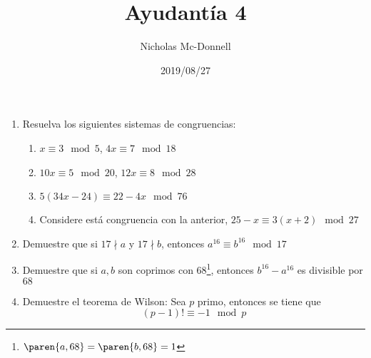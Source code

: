 \documentclass{ayudantia}
\title{Ayudantía 4}
\date{2019/08/27}
\author{Nicholas Mc-Donnell}
\begin{document}
\maketitle
\begin{enumerate}
    \item Resuelva los siguientes sistemas de congruencias:
    \begin{enumerate}[label=\alph*)]
        \item \(x\equiv 3\mod 5\), \(4x\equiv 7\mod 18\)
        \item \(10x\equiv 5\mod 20\), \(12x\equiv 8\mod 28\)
        \item \(5(34x-24)\equiv22-4x\mod 76\)
        \item Considere está congruencia con la anterior, \(25-x\equiv 3(x+2)\mod 27\)
    \end{enumerate}
    \item Demuestre que si \(17\nmid a\) y \(17\nmid b\), entonces \(a^{16}\equiv b^{16}\mod 17\)
    \item Demuestre que si \(a,b\) son coprimos con \(68\)\footnote{\(\paren{a,68}=\paren{b,68}=1\)}, entonces \(b^{16}-a^{16}\) es divisible por \(68\)
    \item Demuestre el teorema de Wilson: Sea \(p\) primo, entonces se tiene que
    \[(p-1)!\equiv -1\mod p\]
\end{enumerate}
\end{document}
